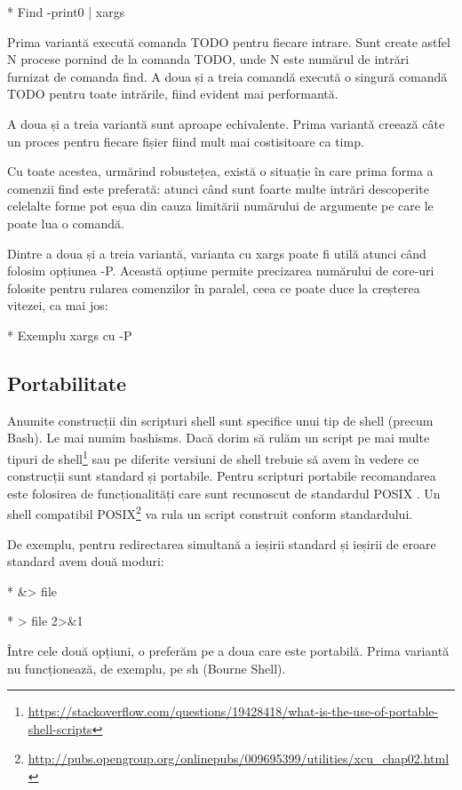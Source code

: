 * Find -print0 | xargs

Prima variantă execută comanda TODO pentru fiecare intrare. Sunt create astfel N
procese pornind de la comanda TODO, unde N este numărul de intrări furnizat de
comanda find. A doua și a treia comandă execută o singură comandă TODO pentru
toate intrările, fiind evident mai performantă.

A doua și a treia variantă sunt aproape echivalente. Prima variantă creează câte
un proces pentru fiecare fișier fiind mult mai costisitoare ca timp.

\begin{note}[NOTĂ]
Cu toate acestea, urmărind robustețea, există o situație în care prima
forma a comenzii find este preferată: atunci când sunt foarte multe
intrări descoperite celelalte forme pot eșua din cauza limitării
numărului de argumente pe care le poate lua o comandă.
\end{note}

Dintre a doua și a treia variantă, varianta cu xargs poate fi utilă atunci când
folosim opțiunea -P. Această opțiune permite precizarea numărului de core-uri
folosite pentru rularea comenzilor în paralel, ceea ce poate duce la creșterea
vitezei, ca mai jos:

* Exemplu xargs cu -P

\subsection{Portabilitate}

Anumite construcții din scripturi shell sunt specifice unui tip de shell (precum
Bash). Le mai numim bashisms. Dacă dorim să rulăm un script pe mai multe tipuri
de
shell\footnote{\url{https://stackoverflow.com/questions/19428418/what-is-the-use-of-portable-shell-scripts}}
sau pe diferite versiuni de shell trebuie să avem în vedere ce construcții sunt
standard și portabile. Pentru scripturi portabile recomandarea este folosirea de
funcționalități care sunt recunoscut de standardul POSIX . Un shell compatibil
POSIX\footnote{\url{http://pubs.opengroup.org/onlinepubs/009695399/utilities/xcu_chap02.html}}
va rula un script construit conform standardului.

De exemplu, pentru redirectarea simultană a ieșirii standard și ieșirii de
eroare standard avem două moduri:

* \&> file

* > file 2>\&1

Între cele două opțiuni, o preferăm pe a doua care este portabilă. Prima
variantă nu funcționează, de exemplu, pe sh (Bourne Shell).

